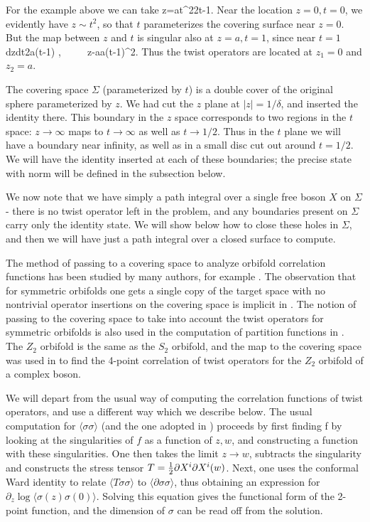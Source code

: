 \documentclass[12pt]{article}
\begin{document}
     For the example above we can take
\be
z=a{t^2\over 2t-1}.
\label{eight}
\ee
Near the location $z=0, t=0$, we evidently have $z\sim t^2$, so
that $t$ parameterizes the covering surface near $z=0$.
But the map between $z$ and $t$ is singular also at $z=a, t=1$, since
near $t=1$
\be
{dz\over dt}\approx 2a(t-1) , ~~~~ z-a\approx a(t-1)^2.
\label{nine}
\ee
Thus the twist operators are located at
$z_1=0$ and $z_2=a$.

The covering space $\Sigma$ (parameterized by $t$) is a double cover
of the original sphere parameterized by $z$.
We had cut the $z$ plane at  $|z|=1/\delta$,  and inserted the identity  there.
This boundary in the $z$ space corresponds to two regions in the $t$
space: $z\rightarrow\infty$ maps to
$t\rightarrow \infty$  as well as $t\rightarrow 1/2$. Thus in the $t$ plane we
will have a  boundary near infinity, as well as  in a small disc cut out around
$t=1/2$.  We will have the identity inserted at each of these
boundaries; the precise state with norm will be
defined in the subsection below.

We now note that we have   simply a path integral over
a single free boson $X$ on $\Sigma$  - there is no
twist operator left in the problem, and any boundaries present on
$\Sigma$ carry only the identity state.
We will show below how to close these holes in $\Sigma$, and then we
will have just a path integral over a
closed surface to compute.

The method of passing to a covering space to analyze orbifold correlation
functions has been studied by many authors, for example \cite{vafaone, dixon}. 
The observation that for symmetric orbifolds one gets a single copy of the
target space with  no nontrivial
operator insertions on the covering space  is
implicit in
\cite{frolov}. The notion of passing to the covering space to take
into account the twist operators for symmetric orbifolds is also used in the
computation of partition functions in \cite{bantay}. The $Z_2$
orbifold is the same as the $S_2$ orbifold, and the map to the
covering space was used in \cite{vafaone,dixon}  to find the 4-point
correlation of twist operators for the $Z_2$ orbifold of a complex boson.

We will depart from the usual way of computing
the correlation functions of twist operators, and use
a different way which we describe below. The usual computation for
$\langle\sigma\sigma\rangle $ (and the one adopted in \cite{dixon,frolov})
proceeds by
first finding
\be
f
\label{ten}
\ee
by looking at the singularities of $f$ as a function of $z,w$, and
constructing a function with these singularities. One then
takes the limit $z\rightarrow w$, subtracts the singularity and
constructs the stress tensor $T={1\over 2} \partial
X^i\partial X^i(w)$. Next, one uses the conformal Ward identity to
relate $\langle T\sigma\sigma\rangle $ to $\langle\partial\sigma
\sigma\rangle$,
thus obtaining an expression for $\partial_z
\log\langle\sigma(z)\sigma(0)\rangle $. Solving this equation gives the
functional
form of
the 2-point function, and the dimension of $\sigma$ can be read off
from the solution.
\end{document}
